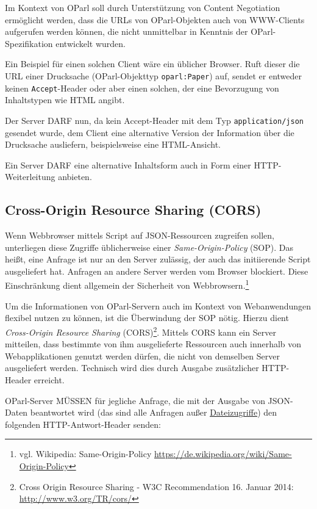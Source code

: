 \documentclass[,a4paper]{article}
\begin{document}
Im Kontext von OParl soll durch Unterstützung von Content Negotiation
ermöglicht werden, dass die URLs von OParl-Objekten auch von WWW-Clients
aufgerufen werden können, die nicht unmittelbar in Kenntnis der
OParl-Spezifikation entwickelt wurden.

Ein Beispiel für einen solchen Client wäre ein üblicher Browser. Ruft
dieser die URL einer Drucksache (OParl-Objekttyp \texttt{oparl:Paper})
auf, sendet er entweder keinen \texttt{Accept}-Header oder aber einen
solchen, der eine Bevorzugung von Inhaltstypen wie HTML angibt.

Der Server DARF nun, da kein Accept-Header mit dem Typ
\texttt{application/json} gesendet wurde, dem Client eine alternative
Version der Information über die Drucksache ausliefern, beispielsweise
eine HTML-Ansicht.

Ein Server DARF eine alternative Inhaltsform auch in Form einer
HTTP-Weiterleitung anbieten.

\subsection{Cross-Origin Resource Sharing (CORS)}\label{cors}

Wenn Webbrowser mittels Script auf JSON-Ressourcen zugreifen sollen,
unterliegen diese Zugriffe üblicherweise einer \emph{Same-Origin-Policy}
(SOP). Das heißt, eine Anfrage ist nur an den Server zulässig, der auch
das initiierende Script ausgeliefert hat. Anfragen an andere Server
werden vom Browser blockiert. Diese Einschränkung dient allgemein der
Sicherheit von Webbrowsern.\footnote{vgl. Wikipedia: Same-Origin-Policy
  \url{https://de.wikipedia.org/wiki/Same-Origin-Policy}}

Um die Informationen von OParl-Servern auch im Kontext von
Webanwendungen flexibel nutzen zu können, ist die Überwindung der SOP
nötig. Hierzu dient \emph{Cross-Origin Resource Sharing}
(CORS)\footnote{Cross Origin Resource Sharing - W3C Recommendation 16.
  Januar 2014: \url{http://www.w3.org/TR/cors/}}. Mittels CORS kann ein
Server mitteilen, dass bestimmte von ihm ausgelieferte Ressourcen auch
innerhalb von Webapplikationen genutzt werden dürfen, die nicht von
demselben Server ausgeliefert werden. Technisch wird dies durch Ausgabe
zusätzlicher HTTP-Header erreicht.

OParl-Server MÜSSEN für jegliche Anfrage, die mit der Ausgabe von
JSON-Daten beantwortet wird (das sind alle Anfragen außer
\hyperref[dateizugriff]{Dateizugriffe}) den folgenden
HTTP-Antwort-Header senden:
\end{document}
